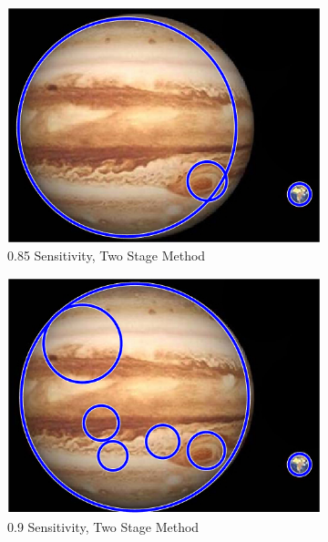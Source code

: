 \begin{figure}[!ht]
    \centering
    \begin{subfigure}{0.49\textwidth}
        \centering
        \includegraphics[width=\textwidth]{Doc/Graphics/Part3/hough_rgb_S085_TwoStage.png}
        \caption{0.85 Sensitivity, Two Stage Method}
    \end{subfigure}
    \hfill
    \begin{subfigure}{0.49\textwidth}
        \centering
        \includegraphics[width=\textwidth]{Doc/Graphics/Part3/hough_rgb_S09_TwoStage.png}
        \caption{0.9 Sensitivity, Two Stage Method}
    \end{subfigure}
    \begin{subfigure}{0.49\textwidth}

\end{subfigure}
\end{figure}
